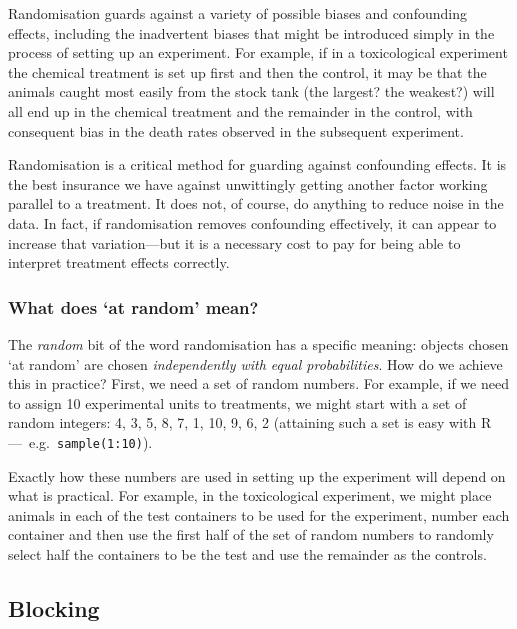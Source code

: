\documentclass[
]{book}
\newenvironment{greybox}{
  \definecolor{shadecolor}{rgb}{0.95,0.95,0.95}  %
  \color{black}
  \begin{shaded}}
 {\end{shaded}}
\newenvironment{infobox}[1]
  {
  \begin{itemize}
  \renewcommand{\labelitemi}{
    \raisebox{-.7\height}[0pt][0pt]{
      {\setkeys{Gin}{width=3em,keepaspectratio}
        \texttt{[image: images/\#1]}}
    }
  }
  \setlength{\fboxsep}{1em}
  \begin{greybox}
  \item
  }
  {
  \end{greybox}
  \end{itemize}
  }
\begin{document}
Randomisation guards against a variety of possible biases and confounding effects, including the inadvertent biases that might be introduced simply in the process of setting up an experiment. For example, if in a toxicological experiment the chemical treatment is set up first and then the control, it may be that the animals caught most easily from the stock tank (the largest? the weakest?) will all end up in the chemical treatment and the remainder in the control, with consequent bias in the death rates observed in the subsequent experiment.

Randomisation is a critical method for guarding against confounding effects. It is the best insurance we have against unwittingly getting another factor working parallel to a treatment. It does not, of course, do anything to reduce noise in the data. In fact, if randomisation removes confounding effectively, it can appear to increase that variation---but it is a necessary cost to pay for being able to interpret treatment effects correctly.

\begin{infobox}{information}

\hypertarget{what-does-at-random-mean}{%
\subsubsection*{What does `at random' mean?}\label{what-does-at-random-mean}}

The \emph{random} bit of the word randomisation has a specific meaning: objects chosen `at random' are chosen \emph{independently with equal probabilities}. How do we achieve this in practice? First, we need a set of random numbers. For example, if we need to assign 10 experimental units to treatments, we might start with a set of random integers: 4, 3, 5, 8, 7, 1, 10, 9, 6, 2 (attaining such a set is easy with R ---~e.g.~\texttt{sample(1:10)}).

Exactly how these numbers are used in setting up the experiment will depend on what is practical. For example, in the toxicological experiment, we might place animals in each of the test containers to be used for the experiment, number each container and then use the first half of the set of random numbers to randomly select half the containers to be the test and use the remainder as the controls.

\end{infobox}

\hypertarget{blocking}{%
\subsection{Blocking}\label{blocking}}
\end{document}
